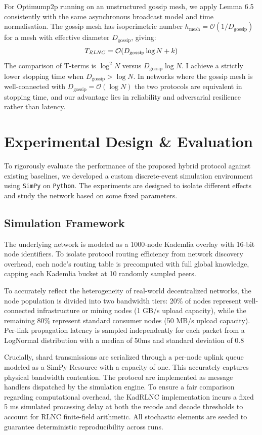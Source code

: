 \documentclass{article}
\begin{document}
For Optimump2p running on an unstructured gossip mesh, we apply Lemma 6.5 consistently with the same asynchronous broadcast model and time normalisation. The gossip mesh has isoperimetric number $h_\text{mesh} = \mathcal{O}{(1/D_\text{gossip})}$ for a mesh with effective diameter $D_\text{gossip}$, giving:
\[
	T_\text{\textit{RLNC}}=\mathcal{O}{(D_\text{gossip}\log N + k})
\]
The comparison of T-terms is $\log^2 N$ versus $D_\text{gossip} \log N$. I achieve a strictly lower stopping time when $D_\text{gossip} > \log N$. In networks where the gossip mesh is well-connected with $D_\text{gossip} = \mathcal{O}{(\log N)}$ the two protocols are equivalent in stopping time, and our advantage lies in reliability and adversarial resilience rather than latency.

\section{Experimental Design \& Evaluation}
To rigorously evaluate the performance of the proposed hybrid protocol against existing baselines, we developed a custom discrete-event simulation environment using \texttt{SimPy} on \texttt{Python}. The experiments are designed to isolate different effects and study the network based on some fixed parameters.

\subsection{Simulation Framework}
The underlying network is modeled as a 1000-node Kademlia overlay with 16-bit node identifiers. To isolate protocol routing efficiency from network discovery overhead, each node's routing table is precomputed with full global knowledge, capping each Kademlia bucket at 10 randomly sampled peers.

To accurately reflect the heterogeneity of real-world decentralized networks, the node population is divided into two bandwidth tiers: 20\% of nodes represent well-connected infrastructure or mining nodes (1 GB/s upload capacity), while the remaining 80\% represent standard consumer nodes (50 MB/s upload capacity). Per-link propagation latency is sampled independently for each packet from a LogNormal distribution with a median of 50ms and standard deviation of 0.8

Crucially, shard transmissions are serialized through a per-node uplink queue modeled as a SimPy Resource with a capacity of one. This accurately captures physical bandwidth contention. The protocol are implemented as message handlers dispatched by the simulation engine. To ensure a fair comparison regarding computational overhead, the KadRLNC implementation incurs a fixed 5 ms simulated processing delay at both the recode and decode thresholds to account for RLNC finite-field arithmetic. All stochastic elements are seeded to guarantee deterministic reproducibility across runs.
\end{document}
